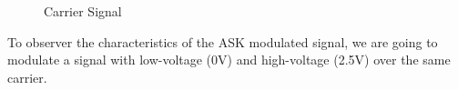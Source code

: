 \documentclass[12pt]{article}
\begin{document}
\begin{figure}[H]
    \centering
    \caption{Carrier Signal}
\end{figure}
To observer the characteristics of the ASK modulated signal, we are going to modulate a signal with low-voltage (0V) and high-voltage (2.5V) over the same carrier.
\end{document}
